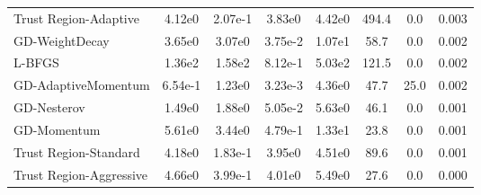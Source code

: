 \documentclass{article}
\begin{document}
\begin{table}[htbp]
{\begin{tabular}{p{2.5cm}*{7}{c}}
Trust Region-Adaptive & 4.12e0 & 2.07e-1 & 3.83e0 & 4.42e0 & 494.4 & 0.0 & 0.003 \\
GD-WeightDecay & 3.65e0 & 3.07e0 & 3.75e-2 & 1.07e1 & 58.7 & 0.0 & 0.002 \\
L-BFGS & 1.36e2 & 1.58e2 & 8.12e-1 & 5.03e2 & 121.5 & 0.0 & 0.002 \\
GD-AdaptiveMomentum & 6.54e-1 & 1.23e0 & 3.23e-3 & 4.36e0 & 47.7 & 25.0 & 0.002 \\
GD-Nesterov & 1.49e0 & 1.88e0 & 5.05e-2 & 5.63e0 & 46.1 & 0.0 & 0.001 \\
GD-Momentum & 5.61e0 & 3.44e0 & 4.79e-1 & 1.33e1 & 23.8 & 0.0 & 0.001 \\
Trust Region-Standard & 4.18e0 & 1.83e-1 & 3.95e0 & 4.51e0 & 89.6 & 0.0 & 0.001 \\
Trust Region-Aggressive & 4.66e0 & 3.99e-1 & 4.01e0 & 5.49e0 & 27.6 & 0.0 & 0.000 \\
\bottomrule
\end{tabular}
}
\end{table}
\end{document}
